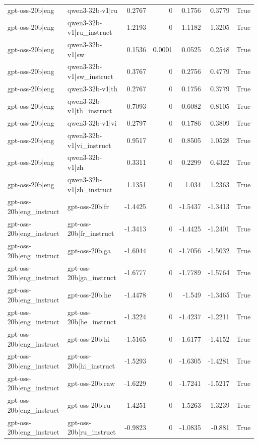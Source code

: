 \begin{table}
\begin{tabular}{l l r r r r l}
gpt-oss-20b|eng & qwen3-32b-v1|ru & 0.2767 & 0 & 0.1756 & 0.3779 & True \\
gpt-oss-20b|eng & qwen3-32b-v1|ru_instruct & 1.2193 & 0 & 1.1182 & 1.3205 & True \\
gpt-oss-20b|eng & qwen3-32b-v1|sw & 0.1536 & 0.0001 & 0.0525 & 0.2548 & True \\
gpt-oss-20b|eng & qwen3-32b-v1|sw_instruct & 0.3767 & 0 & 0.2756 & 0.4779 & True \\
gpt-oss-20b|eng & qwen3-32b-v1|th & 0.2767 & 0 & 0.1756 & 0.3779 & True \\
gpt-oss-20b|eng & qwen3-32b-v1|th_instruct & 0.7093 & 0 & 0.6082 & 0.8105 & True \\
gpt-oss-20b|eng & qwen3-32b-v1|vi & 0.2797 & 0 & 0.1786 & 0.3809 & True \\
gpt-oss-20b|eng & qwen3-32b-v1|vi_instruct & 0.9517 & 0 & 0.8505 & 1.0528 & True \\
gpt-oss-20b|eng & qwen3-32b-v1|zh & 0.3311 & 0 & 0.2299 & 0.4322 & True \\
gpt-oss-20b|eng & qwen3-32b-v1|zh_instruct & 1.1351 & 0 & 1.034 & 1.2363 & True \\
gpt-oss-20b|eng_instruct & gpt-oss-20b|fr & -1.4425 & 0 & -1.5437 & -1.3413 & True \\
gpt-oss-20b|eng_instruct & gpt-oss-20b|fr_instruct & -1.3413 & 0 & -1.4425 & -1.2401 & True \\
gpt-oss-20b|eng_instruct & gpt-oss-20b|ga & -1.6044 & 0 & -1.7056 & -1.5032 & True \\
gpt-oss-20b|eng_instruct & gpt-oss-20b|ga_instruct & -1.6777 & 0 & -1.7789 & -1.5764 & True \\
gpt-oss-20b|eng_instruct & gpt-oss-20b|he & -1.4478 & 0 & -1.549 & -1.3465 & True \\
gpt-oss-20b|eng_instruct & gpt-oss-20b|he_instruct & -1.3224 & 0 & -1.4237 & -1.2211 & True \\
gpt-oss-20b|eng_instruct & gpt-oss-20b|hi & -1.5165 & 0 & -1.6177 & -1.4152 & True \\
gpt-oss-20b|eng_instruct & gpt-oss-20b|hi_instruct & -1.5293 & 0 & -1.6305 & -1.4281 & True \\
gpt-oss-20b|eng_instruct & gpt-oss-20b|raw & -1.6229 & 0 & -1.7241 & -1.5217 & True \\
gpt-oss-20b|eng_instruct & gpt-oss-20b|ru & -1.4251 & 0 & -1.5263 & -1.3239 & True \\
gpt-oss-20b|eng_instruct & gpt-oss-20b|ru_instruct & -0.9823 & 0 & -1.0835 & -0.881 & True \\

\end{tabular}
\end{table}
